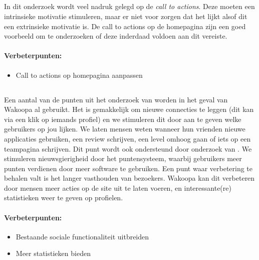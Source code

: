 \documentclass[a4paper, 10pt, pdftex]{report}
\begin{document}
 \subsection{\cite{Beenen2004}}
      In dit onderzoek wordt veel nadruk gelegd op de \emph{call to actions}. Deze moeten een intrinsieke motivatie stimuleren, maar er niet voor zorgen dat het lijkt alsof dit een extrinsieke motivatie is. De call to actions op de homepagina zijn een goed voorbeeld om te onderzoeken of deze inderdaad voldoen aan dit vereiste.

      \paragraph{\textbf{Verbeterpunten:}}
      \begin{itemize}
        \item Call to actions op homepagina aanpassen
      \end{itemize}

    \subsection{\cite{Berlanga2007}}
    Een aantal van de punten uit het onderzoek van \citeauthor{Berlanga2007} worden in het geval van Wakoopa al gebruikt. Het is gemakkelijk om nieuwe connecties te leggen (dit kan via een klik op iemands profiel) en we stimuleren dit door aan te geven welke gebruikers op jou lijken. We laten mensen weten wanneer hun vrienden nieuwe applicaties gebruiken, een review schrijven, een level omhoog gaan of iets op een teampagina schrijven. Dit punt wordt ook ondersteund door onderzoek van \cite{Berlanga2007}. We stimuleren nieuwsgierigheid door het puntensysteem, waarbij gebruikers meer punten verdienen door meer software te gebruiken. Een punt waar verbetering te behalen valt is het langer vasthouden van bezoekers. Wakoopa kan dit verbeteren door mensen meer acties op de site uit te laten voeren, en interessante(re) statistieken weer te geven op profielen.

      \paragraph{\textbf{Verbeterpunten:}}
      \begin{itemize}
        \item Bestaande sociale functionaliteit uitbreiden
        \item Meer statistieken bieden
      \end{itemize}
\end{document}
